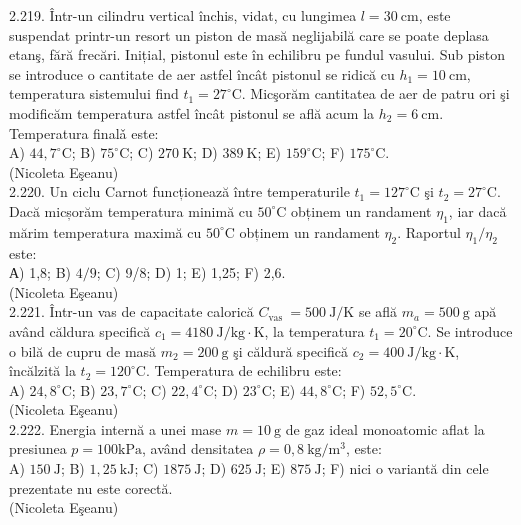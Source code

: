 \documentclass[10pt]{article}
\begin{document}
2.219. Într-un cilindru vertical închis, vidat, cu lungimea $l=30 \mathrm{~cm}$, este suspendat printr-un resort un piston de masă neglijabilă care se poate deplasa etanş, fără frecări. Inițial, pistonul este în echilibru pe fundul vasului. Sub piston se introduce o cantitate de aer astfel încât pistonul se ridică cu $h_{1}=10 \mathrm{~cm}$, temperatura sistemului find $t_{1}=27^{\circ} \mathrm{C}$. Micşorăm cantitatea de aer de patru ori şi modificăm temperatura astfel încât pistonul se află acum la $h_{2}=6 \mathrm{~cm}$. Temperatura finalǎ este:\\ A) $44,7^{\circ} \mathrm{C}$; B) $75^{\circ} \mathrm{C}$; C) $270 \mathrm{~K}$; D) $389 \mathrm{~K}$; E) $159^{\circ} \mathrm{C}$; F) $175^{\circ} \mathrm{C}$.\\ (Nicoleta Eşeanu)\\

2.220. Un ciclu Carnot funcționează între temperaturile $t_{1}=127^{\circ} \mathrm{C}$ şi $t_{2}=27^{\circ} \mathrm{C}$. Dacă micșorăm temperatura minimă cu $50^{\circ} \mathrm{C}$ obținem un randament $\eta_{1}$, iar dacă mărim temperatura maximă cu $50^{\circ} \mathrm{C}$ obținem un randament $\eta_{2}$. Raportul $\eta_{1} / \eta_{2}$ este:\\ А) 1,8; B) $4 / 9$; C) 9/8; D) 1; E) 1,25; F) 2,6.\\ (Nicoleta Eşeanu)\\

2.221. Într-un vas de capacitate calorică $C_{\text {vas }}=500 \mathrm{~J} / \mathrm{K}$ se află $m_{a}=500 \mathrm{~g}$ apă având căldura specifică $c_{1}=4180 \mathrm{~J} / \mathrm{kg} \cdot \mathrm{K}$, la temperatura $t_{1}=20^{\circ} \mathrm{C}$. Se introduce o bilă de cupru de masă $m_{2}=200 \mathrm{~g}$ şi căldură specifică $c_{2}=400 \mathrm{~J} / \mathrm{kg} \cdot \mathrm{K}$, încălzită la $t_{2}=120^{\circ} \mathrm{C}$. Temperatura de echilibru este:\\ A) $24,8^{\circ} \mathrm{C}$; B) $23,7^{\circ} \mathrm{C}$; C) $22,4^{\circ} \mathrm{C}$; D) $23^{\circ} \mathrm{C}$; E) $44,8^{\circ} \mathrm{C}$; F) $52,5^{\circ} \mathrm{C}$.\\ (Nicoleta Eşeanu)\\

2.222. Energia internă a unei mase $m=10 \mathrm{~g}$ de gaz ideal monoatomic aflat la presiunea $p=100 \mathrm{kPa}$, având densitatea $\rho=0,8 \mathrm{~kg} / \mathrm{m}^{3}$, este:\\ A) $150 \mathrm{~J}$; B) $1,25 \mathrm{~kJ}$; C) $1875 \mathrm{~J}$; D) $625 \mathrm{~J}$; E) $875 \mathrm{~J}$; F) nici o variantă din cele prezentate nu este corectă.\\ (Nicoleta Eşeanu)\\
\end{document}
